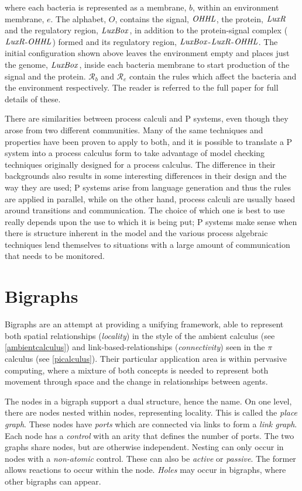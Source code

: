 \noindent where each bacteria is represented as a membrane, $b$, within
an environment membrane, $e$.  The alphabet, $O$, contains the signal,
$\mathit{OHHL}$, the protein, $\mathit{LuxR}$ and the regulatory region, $\mathit{LuxBox}$, in
addition to the protein-signal complex ($\mathit{LuxR}$-$\mathit{OHHL}$) formed and its
regulatory region, $\mathit{LuxBox}$-$\mathit{LuxR}$-$\mathit{OHHL}$.  The initial configuration shown
above leaves the environment empty and places just the genome, $\mathit{LuxBox}$,
inside each bacteria membrane to start production of the signal and the
protein.  $\mathcal{R}_b$ and $\mathcal{R}_e$ contain the rules which
affect the bacteria and the environment respectively.  The reader is
referred to the full paper for full details of these.

There are similarities between process calculi and P systems, even
though they arose from two different communities.  Many of the same
techniques and properties have been proven to apply to both, and it is
possible to translate a P system into a process calculus form to take
advantage of model checking techniques originally designed for a
process calculus.  The difference in their backgrounds also results in
some interesting differences in their design and the way they are
used; P systems arise from language generation and thus the rules are
applied in parallel, while on the other hand, process calculi are
usually based around transitions and communication.  The choice of
which one is best to use really depends upon the use to which it is
being put; P systems make sense when there is structure inherent in
the model and the various process algebraic techniques lend themselves
to situations with a large amount of communication that needs to be
monitored.

\section{Bigraphs}
\label{bigraphs}

Bigraphs \cite*{bigraph1,bigraph2} are an attempt at providing a
unifying framework, able to represent both spatial relationships
(\emph{locality}) in the style of the ambient calculus (see
\ref{ambientcalculus}) and link-based-relationships
(\emph{connectivity}) seen in the $\pi$ calculus (see \ref{picalculus}).
Their particular application area is within pervasive computing, where a
mixture of both concepts is needed to represent both movement through
space and the change in relationships between agents.

The nodes in a bigraph support a dual structure, hence the name.  On one
level, there are nodes nested within nodes, representing locality.  This
is called the \emph{place graph}.  These nodes have \emph{ports} which
are connected via links to form a \emph{link graph}.  Each node has a
\emph{control} with an arity that defines the number of ports.  The two
graphs share nodes, but are otherwise independent.  Nesting can only
occur in nodes with a \emph{non-atomic} control.  These can also be
\emph{active} or \emph{passive}.  The former allows reactions to occur
within the node.  \emph{Holes} may occur in bigraphs, where other
bigraphs can appear.

